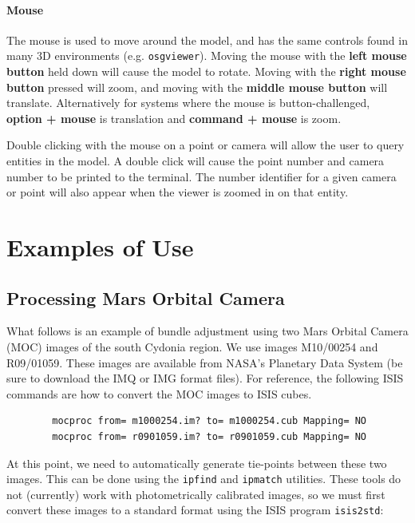 \paragraph{Mouse}
The mouse is used to move around the model, and has the same controls
found in many 3D environments (e.g. \texttt{osgviewer}). Moving the
mouse with the \textbf{left mouse button} held down will cause the
model to rotate.  Moving with the \textbf{right mouse button} pressed
will zoom, and moving with the \textbf{middle mouse button} will
translate. Alternatively for systems where the mouse is
button-challenged, \textbf{option + mouse} is translation and
\textbf{command + mouse} is zoom. 

Double clicking with the mouse on a point or camera will allow the
user to query entities in the model.  A double click will cause the
point number and camera number to be printed to the terminal. The
number identifier for a given camera or point will also appear when
the viewer is zoomed in on that entity.

\section{Examples of Use}

\subsection{Processing Mars Orbital Camera}

What follows is an example of bundle adjustment using two Mars Orbital
Camera (MOC) images of the south Cydonia region. We use images
M10/00254 and R09/01059. These images are available from NASA's
Planetary Data System (be sure to download the IMQ or IMG format
files). For reference, the following ISIS commands are how to convert
the MOC images to ISIS cubes.

\begin{verbatim}
        mocproc from= m1000254.im? to= m1000254.cub Mapping= NO
        mocproc from= r0901059.im? to= r0901059.cub Mapping= NO
\end{verbatim}

At this point, we need to automatically generate tie-points between
these two images.  This can be done using the \texttt{ipfind} and
\texttt{ipmatch} utilities.  These tools do not (currently) work
with photometrically calibrated images, so we must first convert
these images to a standard format using the ISIS program \texttt{isis2std}:

